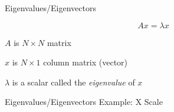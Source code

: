 \documentclass{beamer}
\begin{document}
\begin{frame}{Eigenvalues/Eigenvectors}

\[ Ax = \lambda x \]

$A$ is $N \times N$ matrix

$x$ is $N \times 1$ column matrix (vector)

$\lambda$ is a scalar called the {\em eigenvalue} of $x$




\end{frame}


\begin{frame}{Eigenvalues/Eigenvectors Example: X Scale}




\end{frame}
\end{document}
